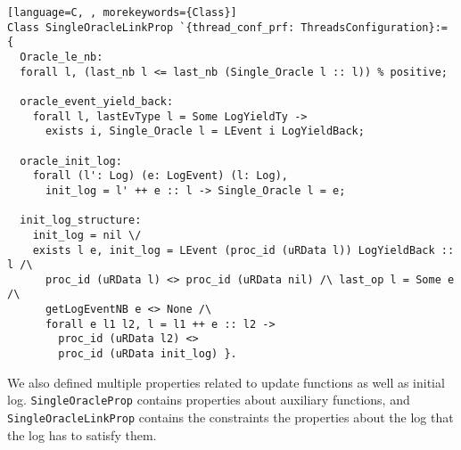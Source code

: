 \begin{lstlisting}[language=C, , morekeywords={Class}]
Class SingleOracleLinkProp `{thread_conf_prf: ThreadsConfiguration}:= {
  Oracle_le_nb: 
  forall l, (last_nb l <= last_nb (Single_Oracle l :: l)) % positive;

  oracle_event_yield_back:
    forall l, lastEvType l = Some LogYieldTy ->
      exists i, Single_Oracle l = LEvent i LogYieldBack;

  oracle_init_log:
    forall (l': Log) (e: LogEvent) (l: Log),
      init_log = l' ++ e :: l -> Single_Oracle l = e;
      
  init_log_structure:
    init_log = nil \/
    exists l e, init_log = LEvent (proc_id (uRData l)) LogYieldBack :: l /\
      proc_id (uRData l) <> proc_id (uRData nil) /\ last_op l = Some e /\
      getLogEventNB e <> None /\
      forall e l1 l2, l = l1 ++ e :: l2 ->
        proc_id (uRData l2) <> 
        proc_id (uRData init_log) }.
\end{lstlisting}
We also defined multiple properties related to 
update functions as well as initial log. 
\lstinline$SingleOracleProp$ contains properties about auxiliary functions, 
and \lstinline$SingleOracleLinkProp$  contains the constraints
the properties about the log that 
the log has to  satisfy them. 

